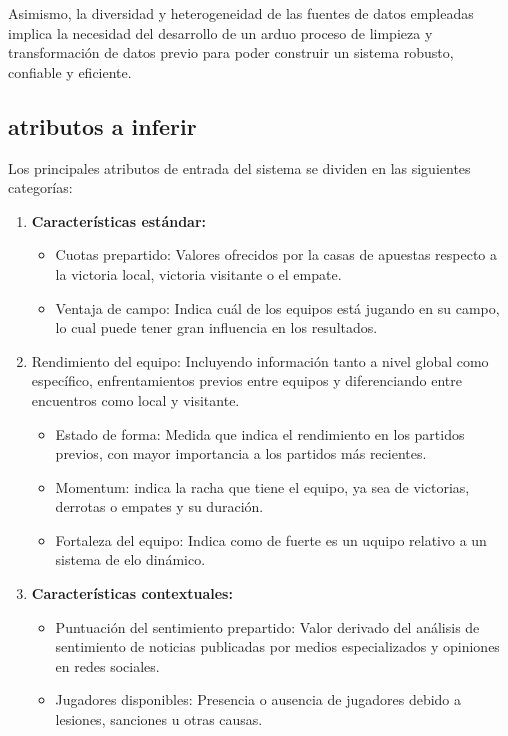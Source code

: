 Asimismo, la diversidad y heterogeneidad de las fuentes de datos empleadas implica la necesidad del desarrollo de un arduo proceso de limpieza y transformación de datos previo para poder construir un sistema robusto, confiable y eficiente. 

\subsection{atributos a inferir}

Los principales atributos de entrada del sistema se dividen en las siguientes categorías:

\begin{enumerate}
    \item \textbf{Características estándar:}
        \begin{itemize}
            \item Cuotas prepartido: Valores ofrecidos por la casas de apuestas respecto a la victoria local, victoria visitante o el empate.
            \item Ventaja de campo: Indica cuál de los equipos está jugando en su campo, lo cual puede tener gran influencia en los resultados.
        \end{itemize}
    \item Rendimiento del equipo: Incluyendo información tanto a nivel global como específico, enfrentamientos previos entre equipos y diferenciando entre encuentros como local y visitante.
    \begin{itemize}
        \item Estado de forma: Medida que indica el rendimiento en los partidos previos, con mayor importancia a los partidos más recientes.
        \item Momentum: indica la racha que tiene el equipo, ya sea de victorias, derrotas o empates y su duración.
        \item Fortaleza del equipo: Indica como de fuerte es un uquipo relativo a un sistema de elo dinámico.
    \end{itemize}
    \item \textbf{Características contextuales:}
    \begin{itemize}
        \item Puntuación del sentimiento prepartido: Valor derivado del análisis de sentimiento de noticias publicadas por medios especializados y opiniones en redes sociales.
        \item Jugadores disponibles: Presencia o ausencia de jugadores debido a lesiones, sanciones u otras causas.

\end{itemize}
\end{enumerate}
